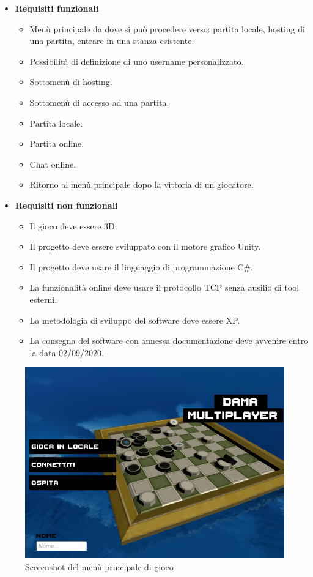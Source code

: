 \documentclass[12pt]{article}
\begin{document}
\begin{itemize}
\item \textbf{Requisiti funzionali}
\begin{itemize}
\item Menù principale da dove si può procedere verso: partita locale, hosting di una partita, entrare in una stanza esistente.
\item Possibilità di definizione di uno username personalizzato.
\item Sottomenù di hosting.
\item Sottomenù di accesso ad una partita.
\item Partita locale.
\item Partita online.
\item Chat online.
\item Ritorno al menù principale dopo la vittoria di un giocatore.
\end{itemize}
\item \textbf{Requisiti non funzionali}
\begin{itemize}
\item Il gioco deve essere 3D.
\item Il progetto deve essere sviluppato con il motore grafico Unity.
\item Il progetto deve usare il linguaggio di programmazione C\#.
\item La funzionalità online deve usare il protocollo TCP senza ausilio di tool esterni.
\item La metodologia di sviluppo del software deve essere XP.
\item La consegna del software con annessa documentazione deve avvenire entro la data 02/09/2020.
\end{itemize}
\end{itemize}

\begin{figure}[H]
\centering
\includegraphics[scale=.5]{MainMenu}
\caption{Screenshot del menù principale di gioco}
\label{img:mainmenu}
\end{figure}
\end{document}
